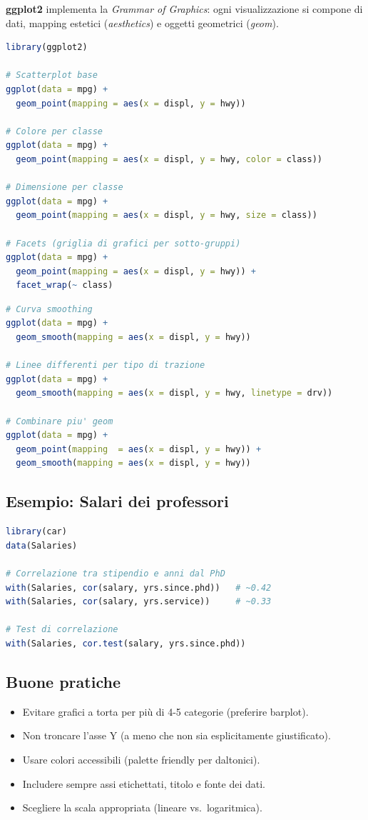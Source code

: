 \documentclass[12pt,a4paper]{article}
\begin{document}
\textbf{ggplot2} implementa la \textit{Grammar of Graphics}: ogni visualizzazione si
compone di dati, mapping estetici (\textit{aesthetics}) e oggetti geometrici (\textit{geom}).

\begin{lstlisting}[language=R]
library(ggplot2)

# Scatterplot base
ggplot(data = mpg) +
  geom_point(mapping = aes(x = displ, y = hwy))

# Colore per classe
ggplot(data = mpg) +
  geom_point(mapping = aes(x = displ, y = hwy, color = class))

# Dimensione per classe
ggplot(data = mpg) +
  geom_point(mapping = aes(x = displ, y = hwy, size = class))

# Facets (griglia di grafici per sotto-gruppi)
ggplot(data = mpg) +
  geom_point(mapping = aes(x = displ, y = hwy)) +
  facet_wrap(~ class)
\end{lstlisting}

\begin{lstlisting}[language=R]
# Curva smoothing
ggplot(data = mpg) +
  geom_smooth(mapping = aes(x = displ, y = hwy))

# Linee differenti per tipo di trazione
ggplot(data = mpg) +
  geom_smooth(mapping = aes(x = displ, y = hwy, linetype = drv))

# Combinare piu' geom
ggplot(data = mpg) +
  geom_point(mapping  = aes(x = displ, y = hwy)) +
  geom_smooth(mapping = aes(x = displ, y = hwy))
\end{lstlisting}

\subsection{Esempio: Salari dei professori}

\begin{lstlisting}[language=R]
library(car)
data(Salaries)

# Correlazione tra stipendio e anni dal PhD
with(Salaries, cor(salary, yrs.since.phd))   # ~0.42
with(Salaries, cor(salary, yrs.service))     # ~0.33

# Test di correlazione
with(Salaries, cor.test(salary, yrs.since.phd))
\end{lstlisting}

\subsection{Buone pratiche}

\begin{itemize}
  \item Evitare grafici a torta per più di 4-5 categorie (preferire barplot).
  \item Non troncare l'asse Y (a meno che non sia esplicitamente giustificato).
  \item Usare colori accessibili (palette friendly per daltonici).
  \item Includere sempre assi etichettati, titolo e fonte dei dati.
  \item Scegliere la scala appropriata (lineare vs.\ logaritmica).
\end{itemize}
\end{document}
